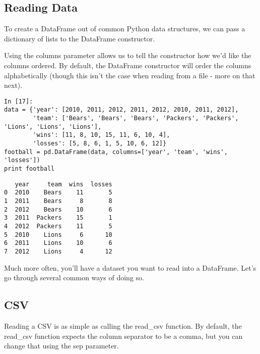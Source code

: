 \documentclass[KSmain.tex]{subfiles}
\begin{document}
\subsection{Reading Data}

To create a DataFrame out of common Python data structures, we can pass a dictionary of lists to the DataFrame constructor.

Using the columns parameter allows us to tell the constructor how we'd like the columns ordered. By default, the DataFrame constructor will order the columns alphabetically (though this isn't the case when reading from a file - more on that next).

\begin{framed}
\begin{verbatim}
In [17]:
data = {'year': [2010, 2011, 2012, 2011, 2012, 2010, 2011, 2012],
        'team': ['Bears', 'Bears', 'Bears', 'Packers', 'Packers', 'Lions', 'Lions', 'Lions'],
        'wins': [11, 8, 10, 15, 11, 6, 10, 4],
        'losses': [5, 8, 6, 1, 5, 10, 6, 12]}
football = pd.DataFrame(data, columns=['year', 'team', 'wins', 'losses'])
print football
\end{verbatim}
\end{framed}
\begin{verbatim}
   year     team  wins  losses
0  2010    Bears    11       5
1  2011    Bears     8       8
2  2012    Bears    10       6
3  2011  Packers    15       1
4  2012  Packers    11       5
5  2010    Lions     6      10
6  2011    Lions    10       6
7  2012    Lions     4      12
\end{verbatim}


Much more often, you'll have a dataset you want to read into a DataFrame. Let's go through several common ways of doing so.

\subsection{CSV}

Reading a CSV is as simple as calling the read\_csv function. By default, the read\_csv function expects the column separator to be a comma, but you can change that using the sep parameter.
\end{document}
